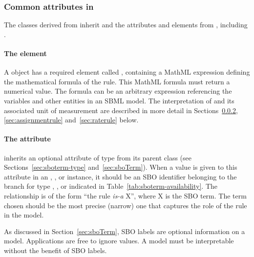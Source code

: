 \subsubsection{Common attributes in }
\label{sec:rule-math}\label{sec:rule-fields}\label{sec:rule-sboterm}

The classes derived from \Rule inherit  and
  the attributes and elements from \SBase, including
.


\paragraph{The  element}

A \Rule object has a required element called ,
containing a MathML expression defining the mathematical formula
of the rule.  This MathML formula must return a numerical value.
The formula can be an arbitrary expression referencing the
variables and other entities in an SBML model.  The interpretation
of  and its associated unit of measurement are
described in more detail in Sections~\ref{sec:algebraicrule},
\ref{sec:assignmentrule} and~\ref{sec:raterule} below.


\paragraph{The  attribute}

\Rule inherits an optional 
attribute of type  from its parent
class \SBase (see Sections~\ref{sec:sboterm-type}
and~\ref{sec:sboTerm}).  When a value is given to this
attribute in an \AlgebraicRule, \AssignmentRule, or
\RateRule instance, it should be an
SBO identifier belonging to the branch for type  \AlgebraicRule, \AssignmentRule, or
\RateRule indicated in Table~\ref{tab:sboterm-availability}.  The relationship is
of the form ``the rule \emph{is-a} X'', where X is
the SBO term.  The term chosen should be the most precise (narrow)
one that captures the role of the rule in the model.

As discussed in Section~\ref{sec:sboTerm}, SBO labels are optional
information on a model.  Applications are free to ignore
 values.  A model must be interpretable without the
benefit of SBO labels.


\subsubsection{}
\label{sec:algebraicrule}

